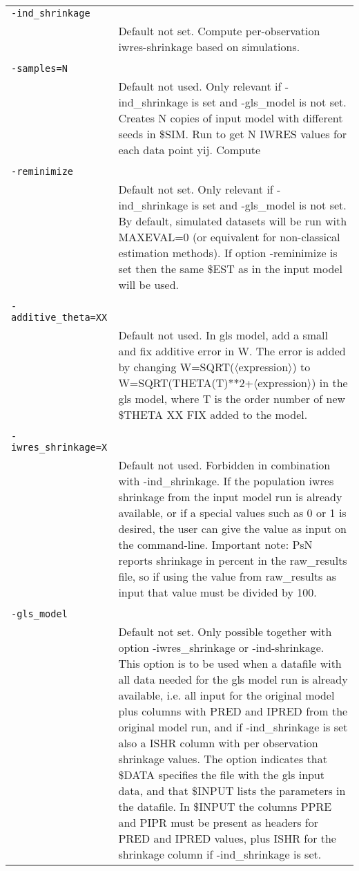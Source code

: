 \documentclass[a4paper,12pt]{article}
\begin{document}
\begin{longtable}{p{1in}p{4in}}
\verb|-ind_shrinkage| & \\
\nopagebreak
 & Default not set. Compute per-observation iwres-shrinkage based on simulations. \\
\\
\verb|-samples=N| & \\
\nopagebreak
 & Default not used. Only relevant if -ind\_shrinkage is set and -gls\_model is not set. Creates N copies of input model with different seeds in \$SIM. Run to get N IWRES values for each data point yij. Compute  \\
\\
\verb|-reminimize| & \\
\nopagebreak
 & Default not set. Only relevant if -ind\_shrinkage is set and -gls\_model is not set. By default, simulated datasets will be run with MAXEVAL=0 (or equivalent for non-classical estimation methods). If option -reminimize is set then the same \$EST as in the input model will be used. \\
\\
\verb|-additive_theta=XX| & \\
\nopagebreak
 & Default not used. In gls model, add a small and fix additive error in W. The error is added by changing W=SQRT($\langle$expression$\rangle$) to W=SQRT(THETA(T)**2+$\langle$expression$\rangle$) in the gls model, where T is the order number of new \$THETA XX FIX added to the model. \\
\\
\verb|-iwres_shrinkage=X| & \\
\nopagebreak
 & Default not used. Forbidden in combination with -ind\_shrinkage. If the population iwres shrinkage from the input model run is already available, or if a special values such as 0 or 1 is desired, the user can give the value as input on the command-line. Important note: PsN reports shrinkage in percent in the raw\_results file, so if using the value from raw\_results as input that value must be divided by 100.   \\
\\
\verb|-gls_model| & \\
\nopagebreak
 & Default not set. Only possible together with option -iwres\_shrinkage or -ind-shrinkage. This option is to be used when a datafile with all data needed for the gls model run is already available, i.e. all input for the original model plus columns with PRED and IPRED from the original model run, and if -ind\_shrinkage is set also a ISHR column with per observation shrinkage values. The option indicates that \$DATA specifies the file with the gls input data, and that \$INPUT lists the parameters in the datafile. In \$INPUT the columns PPRE and PIPR must be present as headers for PRED and IPRED values, plus ISHR for the shrinkage column if -ind\_shrinkage is set. \\

\end{longtable}
\end{document}
